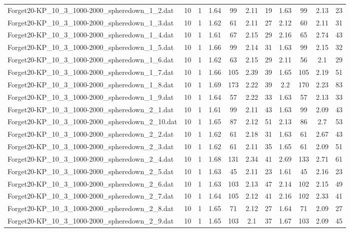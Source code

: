 \begin{table}[!ht]
\begin{tabular}{lcccccccccc}
Forget20-KP\_10\_3\_1000-2000\_spheredown\_1\_2.dat & 10 & 1 & 1.64 & 99 & 2.11 & 19 & 1.63 & 99 & 2.13 & 23 \\
Forget20-KP\_10\_3\_1000-2000\_spheredown\_1\_3.dat & 10 & 1 & 1.62 & 61 & 2.11 & 27 & 2.12 & 60 & 2.11 & 31 \\
Forget20-KP\_10\_3\_1000-2000\_spheredown\_1\_4.dat & 10 & 1 & 1.61 & 67 & 2.15 & 29 & 2.16 & 65 & 2.74 & 43 \\
Forget20-KP\_10\_3\_1000-2000\_spheredown\_1\_5.dat & 10 & 1 & 1.66 & 99 & 2.14 & 31 & 1.63 & 99 & 2.15 & 32 \\
Forget20-KP\_10\_3\_1000-2000\_spheredown\_1\_6.dat & 10 & 1 & 1.62 & 63 & 2.15 & 29 & 2.11 & 56 & 2.1 & 29 \\
Forget20-KP\_10\_3\_1000-2000\_spheredown\_1\_7.dat & 10 & 1 & 1.66 & 105 & 2.39 & 39 & 1.65 & 105 & 2.19 & 51 \\
Forget20-KP\_10\_3\_1000-2000\_spheredown\_1\_8.dat & 10 & 1 & 1.69 & 173 & 2.22 & 39 & 2.2 & 170 & 2.23 & 83 \\
Forget20-KP\_10\_3\_1000-2000\_spheredown\_1\_9.dat & 10 & 1 & 1.64 & 57 & 2.22 & 33 & 1.63 & 57 & 2.13 & 33 \\
Forget20-KP\_10\_3\_1000-2000\_spheredown\_2\_1.dat & 10 & 1 & 1.61 & 99 & 2.11 & 43 & 1.63 & 99 & 2.09 & 43 \\
Forget20-KP\_10\_3\_1000-2000\_spheredown\_2\_10.dat & 10 & 1 & 1.65 & 87 & 2.12 & 51 & 2.13 & 86 & 2.7 & 53 \\
Forget20-KP\_10\_3\_1000-2000\_spheredown\_2\_2.dat & 10 & 1 & 1.62 & 61 & 2.18 & 31 & 1.63 & 61 & 2.67 & 43 \\
Forget20-KP\_10\_3\_1000-2000\_spheredown\_2\_3.dat & 10 & 1 & 1.62 & 61 & 2.11 & 35 & 1.65 & 61 & 2.09 & 51 \\
Forget20-KP\_10\_3\_1000-2000\_spheredown\_2\_4.dat & 10 & 1 & 1.68 & 131 & 2.34 & 41 & 2.69 & 133 & 2.71 & 61 \\
Forget20-KP\_10\_3\_1000-2000\_spheredown\_2\_5.dat & 10 & 1 & 1.63 & 45 & 2.11 & 23 & 1.61 & 45 & 2.16 & 23 \\
Forget20-KP\_10\_3\_1000-2000\_spheredown\_2\_6.dat & 10 & 1 & 1.63 & 103 & 2.13 & 47 & 2.14 & 102 & 2.15 & 49 \\
Forget20-KP\_10\_3\_1000-2000\_spheredown\_2\_7.dat & 10 & 1 & 1.64 & 105 & 2.12 & 41 & 2.16 & 102 & 2.33 & 41 \\
Forget20-KP\_10\_3\_1000-2000\_spheredown\_2\_8.dat & 10 & 1 & 1.65 & 71 & 2.12 & 27 & 1.64 & 71 & 2.09 & 27 \\
Forget20-KP\_10\_3\_1000-2000\_spheredown\_2\_9.dat & 10 & 1 & 1.65 & 103 & 2.1 & 37 & 1.67 & 103 & 2.09 & 45 \\

\end{tabular}
\end{table}
